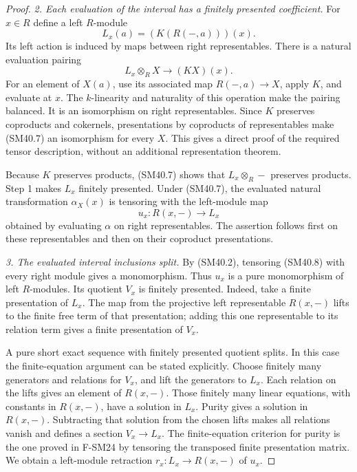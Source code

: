 \begin{proof}
\emph{2. Each evaluation of the interval has a finitely presented coefficient.}
For \(x\in R\) define a left \(R\)-module
\[
                   L_x(a)=(K(R(-,a)))(x).                   \tag{SM40.6}
\]
Its left action is induced by maps between right
representables.  There is a natural evaluation pairing
\[
                  L_x\otimes_R X\longrightarrow(KX)(x).
                                                               \tag{SM40.7}
\]
For an element of \(X(a)\), use its associated map
\(R(-,a)\to X\), apply \(K\), and evaluate at \(x\).
The \(k\)-linearity and naturality of this operation make
the pairing balanced.  It is an isomorphism on right
representables.  Since \(K\) preserves coproducts and
cokernels, presentations by coproducts of representables
make (SM40.7) an isomorphism for every \(X\).
This gives a direct proof of the required tensor
description, without an additional representation theorem.

Because \(K\) preserves products, (SM40.7) shows that
\(L_x\otimes_R-\) preserves products.  Step 1 makes
\(L_x\) finitely presented.  Under (SM40.7), the evaluated
natural transformation \(\alpha_X(x)\) is tensoring with
the left-module map
\[
                       u_x:R(x,-)\longrightarrow L_x        \tag{SM40.8}
\]
obtained by evaluating \(\alpha\) on right representables.
The assertion follows first on these representables and
then on their coproduct presentations.

\emph{3. The evaluated interval inclusions split.}
By (SM40.2), tensoring (SM40.8) with every right module
gives a monomorphism.  Thus \(u_x\) is a pure monomorphism
of left \(R\)-modules.  Its quotient \(V_x\) is finitely
presented.  Indeed, take a finite presentation of \(L_x\).
The map from the projective left representable \(R(x,-)\)
lifts to the finite free term of that presentation; adding
this one representable to its relation term gives a finite
presentation of \(V_x\).

A pure short exact sequence with finitely presented
quotient splits.  In this case the finite-equation argument
can be stated explicitly.  Choose finitely many generators
and relations for \(V_x\), and lift the generators to
\(L_x\).  Each relation on the lifts gives an element of
\(R(x,-)\).  Those finitely many linear equations, with
constants in \(R(x,-)\), have a solution in \(L_x\).
Purity gives a solution in \(R(x,-)\).  Subtracting that
solution from the chosen lifts makes all relations vanish
and defines a section \(V_x\to L_x\).  The finite-equation
criterion for purity is the one proved in F-SM24 by
tensoring the transposed finite presentation matrix.
We obtain a left-module retraction
\(r_x:L_x\to R(x,-)\) of \(u_x\).


\end{proof}
